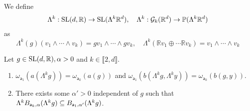 \documentclass{report}
\begin{document}
\begin{definition}
    We define
    \[
    \Lambda^k : \operatorname{{\mathrm{SL}}}(d, \mathbb R) \to \operatorname{{\mathrm{SL}}}(\Lambda^k \mathbb R^d), \quad
    \Lambda^k : \mathcal G_k(\mathbb R^d) \to \mathbb P(\Lambda^k \mathbb R^d)
    \]
    as
    \[
    \Lambda^k(g)(v_1 \wedge \cdots \wedge v_k) = g v_1 \wedge \cdots \wedge g v_k,\quad
    \Lambda^k(\mathbb R v_1 \oplus \cdots \mathbb R v_k) =  v_1 \wedge \cdots \wedge v_k
    \]
\end{definition}
\begin{lemma}
    Let $g \in \operatorname{{\mathrm{SL}}}(d, \mathbb R), \alpha > 0$ and $k \in \llbracket 2, d \rrbracket$.
    \begin{enumerate}[label=(\roman*)]
        \item $\omega_{\mathsf{a}_1}(a(\Lambda^k g)) = \omega_{\mathsf{a}_k}(a(g))$ and $\omega_{\mathsf{a}_1}(b(\Lambda^k g, \Lambda^k y)) = \omega_{\mathsf{a}_k}(b(g, y))$.
        \item There exists some $\alpha' > 0$ independent of $g$ such that $\Lambda^k B_{{\sf a}_k, \alpha}(\Lambda^k g) \subseteq B_{{\sf a}_1, \alpha'}(\Lambda^k g)$.
    \end{enumerate}
\end{lemma}
\end{document}
